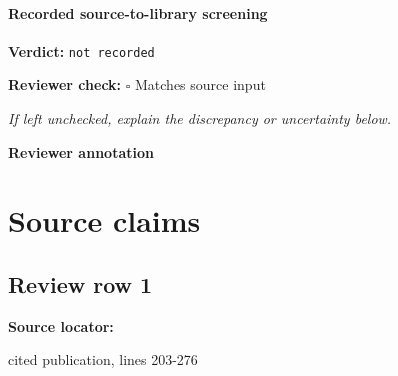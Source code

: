 \documentclass[10pt]{article}
\newcommand{\reviewerbox}{%
  \par\noindent\fbox{\parbox{0.96\linewidth}{\rule{0pt}{0.38in}}}\par
}
\newcommand{\reviewmatch}[1]{%
  \par\noindent\textbf{Reviewer check:} $\square$\; #1\par
  \noindent\emph{If left unchecked, explain the discrepancy or uncertainty below.}\par
}
\begin{document}
\paragraph{Recorded source-to-library screening}
\textbf{Verdict:} \texttt{not recorded}
\reviewmatch{Matches source input}
\noindent\textbf{Reviewer annotation}\par
\reviewerbox

\clearpage
\hypertarget{source-claim-7a45c0b2fffc539f}{}
\hypertarget{source-section-f10b5f68e4acf3dc}{}
\section*{Source claims}
\subsection*{Review row 1}
\textbf{Source locator:} {\footnotesize\raggedright cited publication, lines 203-\allowbreak{}276\par}
\end{document}
